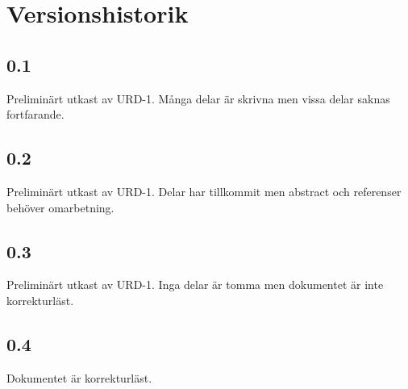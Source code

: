 \section*{Versionshistorik}

\subsection*{0.1}
Preliminärt utkast av URD-1. Många delar är skrivna men vissa delar saknas fortfarande.

\subsection*{0.2}
Preliminärt utkast av URD-1. Delar har tillkommit men abstract och referenser behöver omarbetning.

\subsection*{0.3}
Preliminärt utkast av URD-1. Inga delar är tomma men dokumentet är inte korrekturläst.

\subsection*{0.4}
Dokumentet är korrekturläst.